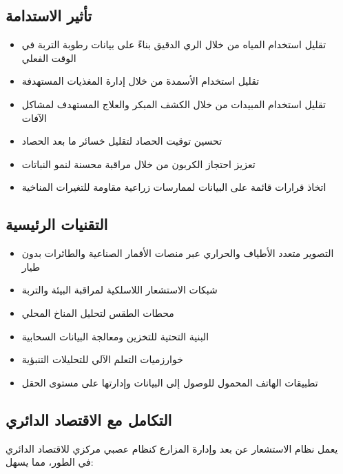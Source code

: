 \subsection{تأثير الاستدامة}
\begin{itemize}
    \item تقليل استخدام المياه من خلال الري الدقيق بناءً على بيانات رطوبة التربة في الوقت الفعلي
    \item تقليل استخدام الأسمدة من خلال إدارة المغذيات المستهدفة
    \item تقليل استخدام المبيدات من خلال الكشف المبكر والعلاج المستهدف لمشاكل الآفات
    \item تحسين توقيت الحصاد لتقليل خسائر ما بعد الحصاد
    \item تعزيز احتجاز الكربون من خلال مراقبة محسنة لنمو النباتات
    \item اتخاذ قرارات قائمة على البيانات لممارسات زراعية مقاومة للتغيرات المناخية
\end{itemize}

\subsection{التقنيات الرئيسية}
\begin{itemize}
    \item التصوير متعدد الأطياف والحراري عبر منصات الأقمار الصناعية والطائرات بدون طيار
    \item شبكات الاستشعار اللاسلكية لمراقبة البيئة والتربة
    \item محطات الطقس لتحليل المناخ المحلي
    \item البنية التحتية للتخزين ومعالجة البيانات السحابية
    \item خوارزميات التعلم الآلي للتحليلات التنبؤية
    \item تطبيقات الهاتف المحمول للوصول إلى البيانات وإدارتها على مستوى الحقل
\end{itemize}

\subsection{التكامل مع الاقتصاد الدائري}
يعمل نظام الاستشعار عن بعد وإدارة المزارع كنظام عصبي مركزي للاقتصاد الدائري في الطور، مما يسهل:

